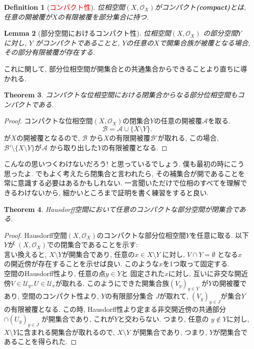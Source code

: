 \documentclass[lualatex]{ltjsbook}
\newtheorem{theorem}{Theorem}[chapter]
\newtheorem{lemma}[theorem]{Lemma}
\newtheorem{definition}[theorem]{Definition}
\theoremstyle{remark}
\theoremstyle{plain}
\begin{document}
\begin{definition}[\textcolor{red}{コンパクト性}]
	位相空間$\left( X ,  \mathcal{O}_{X} \right)$がコンパクト\textbf{(compact)}とは,  任意の開被覆が$X$の有限被覆を部分集合に持つ.	
\end{definition}

\begin{lemma}[部分空間におけるコンパクト性]
	位相空間$\left( X ,  \mathcal{O}_{X} \right)$ の部分空間$Y$ に対し,  
	$Y$ がコンパクトであることと,   $Y$の任意の$X$で開集合族が被覆となる場合,  その部分有限被覆が存在する.
\end{lemma}

これに関して,  部分位相空間が開集合との共通集合からできることより直ちに導かれる.

\begin{theorem}
	コンパクトな位相空間における閉集合からなる部分位相空間もコンパクトである.
\end{theorem}

\begin{proof}
	コンパクトな位相空間$\left( X ,  \mathcal{O}_{X} \right)$の閉集合$Y$の任意の開被覆$\mathcal{A}$を取る.
	\[
		\mathcal{B}= \mathcal{A} \cup \{X \setminus Y\}
	.\] 
	が$X$の開被覆となるので,   $\mathcal{B}$ から$X$の有限開被覆$\mathcal{B'}$が取れる,  この場合,  $\mathcal{B'} \setminus \{ X \setminus Y\}$が$\mathcal{A}$ から取り出した$Y$の有限被覆となる. 
\end{proof}

こんなの思いつくわけないだろう! と思っているでしょう. 僕も最初の時にこう思ったよ. 
でもよく考えたら閉集合と言われたら,  その補集合が開であることを常に意識する必要はあるかもしれない. 
一言聞いただけで位相のすべてを理解できるわけないから,  細かいところまで証明を書く練習をすると良い.

\begin{theorem}
	Hausdorff空間において任意のコンパクトな部分空間が閉集合である.
\end{theorem}

\begin{proof}
	Hausdorff空間$\left( X ,  \mathcal{O}_{X} \right)$のコンパクトな部分位相空間$Y$を任意に取る.
	以下$Y$が $\left(  X,  \mathcal{O}_{X} \right)$での閉集合であることを示す:\\
	言い換えると,  $X\setminus Y$が開集合であり,  任意の$x \in X \setminus Y$ に対し, 
	$V \cap Y = \emptyset$ となる$x$ の開近傍が存在することを示せば良い. このような$x$を1つ取って固定する.\\
	空間のHausdorff性より,  任意の点$y \in Y$と 固定された$x$に対し,  互いに非交な開近傍$V \in \mathcal{U}_y, U \in \mathcal{U}_x$が取れる. 
	このようにできた開集合族$\left( V_y \right) _{y \in Y}$ が$Y$の開被覆であり, 
	空間のコンパクト性より,   $Y$の有限部分集合 $J$が取れて,  
	$\left( V_y \right) _{y \in J}$が集合$Y$の有限被覆となる. 
	この時,  Hausdorff性より定まる非交開近傍の共通部分 $\cap \left( U_y \right) _{y \in J}$ が開集合であり,  
	これが$Y$と交わらない.
	つまり,  任意の $y \not\in Y$に対し, 
	$X \setminus Y$に含まれる開集合が取れるので,  
	$X \setminus Y$ が開集合であり,  
	つまり,  $Y$が閉集合であることを得られた.
\end{proof}
\end{document}

